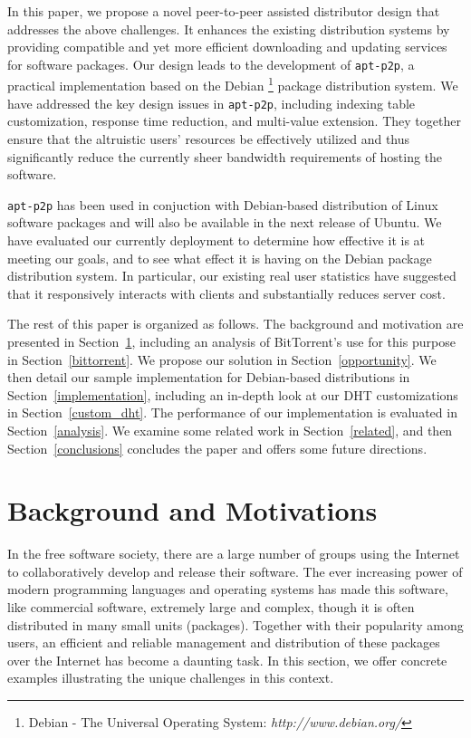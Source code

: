 \documentclass[conference]{IEEEtran}
\begin{document}
In this paper, we propose a novel peer-to-peer assisted distributor design that
addresses the above challenges. It enhances the existing distribution systems by providing compatible and yet more efficient downloading and updating services
for software packages. Our design leads to the development of \texttt{apt-p2p}, a practical implementation based on the Debian \footnote{Debian - The Universal Operating System: {\it http://www.debian.org/}} package
distribution system.  We have addressed the key design issues in \texttt{apt-p2p}, including indexing table customization,
response time reduction, and multi-value extension. They together ensure
that the altruistic users' resources be effectively utilized and thus significantly reduce the currently
sheer bandwidth requirements of hosting the software.

\texttt{apt-p2p}  has been used in conjuction with Debian-based distribution of Linux
software packages and will also be available in the next release of Ubuntu. We have evaluated our currently deployment  to
determine how effective it is at meeting our goals, and to see what
effect it is having on the Debian package distribution system. In particular, our existing real user statistics
have suggested that it responsively interacts with clients and substantially reduces server cost.

The rest of this paper is organized as follows. The background and motivation are presented in Section~\ref{situation}, including an analysis of BitTorrent's use for this purpose in Section~\ref{bittorrent}. We propose
our solution in Section~\ref{opportunity}. We then detail our sample
implementation for Debian-based distributions in Section~\ref{implementation},
including an in-depth look at our DHT
customizations in Section~\ref{custom_dht}. The performance of our implementation is evaluated in Section~\ref{analysis}. We examine some related work in Section~\ref{related}, and then
Section~\ref{conclusions} concludes the paper and offers some future directions.


\section{Background and Motivations}
\label{situation}

In the free software society, there are a large number of groups using the Internet to
collaboratively develop and release their software. The ever increasing power of
modern programming languages and operating systems has made this software, like commercial software, extremely large and complex, though it is often
distributed in many small units (packages). Together with their popularity among users,
an efficient and reliable management and distribution of these packages over the Internet has become a daunting task. In this section, we offer concrete examples illustrating the
unique challenges in this context.
\end{document}
